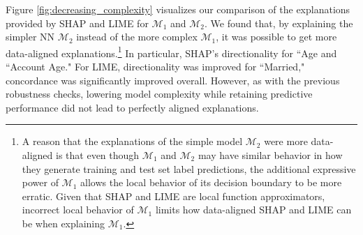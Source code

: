 \documentclass[mnsc,blindrev]{informs3}
\begin{document}
            Figure \ref{fig:decreasing_complexity} visualizes our comparison of the explanations provided by SHAP and LIME for $\mathcal{M}_1$ and $\mathcal{M}_2$. %
            We found that, by explaining the simpler NN $\mathcal{M}_2$ instead of the more complex $\mathcal{M}_1$, it was possible to get more data-aligned explanations.\footnote{A reason that the explanations of the simple model $\mathcal{M}_2$ were more data-aligned is that even though $\mathcal{M}_1$ and $\mathcal{M}_2$ may have similar behavior in how they generate training and test set label predictions, the additional expressive power of $\mathcal{M}_1$ allows the local behavior of its decision boundary to be more erratic. Given that SHAP and LIME are local function approximators, incorrect local behavior of $\mathcal{M}_1$ limits how data-aligned SHAP and LIME can be when explaining $\mathcal{M}_1$.} %
            In particular, SHAP's directionality for ``Age and ``Account Age."%
            For LIME, directionality was improved for ``Married," concordance was significantly improved overall. However, as with the previous robustness checks, lowering model complexity while retaining predictive performance did not lead to perfectly aligned explanations. %

            
            
\end{document}
